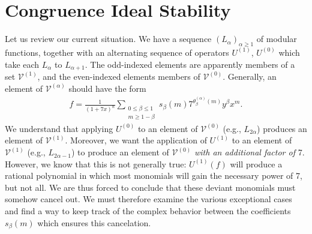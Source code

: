 \documentclass[reqno]{amsart}
\theoremstyle{definition}
\theoremstyle{remark}
\numberwithin{equation}{section}
\begin{document}
\section{Congruence Ideal Stability}\label{sectionstable} 

Let us review our current situation.  We have a sequence $\left( L_{\alpha} \right)_{\alpha\ge 1}$ of modular functions, together with an alternating sequence of operators $U^{(1)}$, $U^{(0)}$ which take each $L_{\alpha}$ to $L_{\alpha+1}$.  The odd-indexed elements are apparently members of a set $\mathcal{V}^{(1)}$, and the even-indexed elements members of $\mathcal{V}^{(0)}$.  Generally, an element of $\mathcal{V}^{(\alpha)}$ should have the form
\begin{align*}
f =\frac{1}{(1+7x)^n}\sum_{\substack{0\le\beta\le 1\\ m\ge 1-\beta}}s_{\beta}(m)7^{\theta^{(\alpha)}_{\beta}(m)}y^{\beta}x^m.
\end{align*}  We understand that applying $U^{(0)}$ to an element of $\mathcal{V}^{(0)}$ (e.g., $L_{2\alpha}$) produces an element of $\mathcal{V}^{(1)}$.  Moreover, we want the application of $U^{(1)}$ to an element of $\mathcal{V}^{(1)}$ (e.g., $L_{2\alpha-1}$) to produce an element of $\mathcal{V}^{(0)}$ \textit{with an additional factor of} 7.  However, we know that this is not generally true: $U^{(1)}(f)$ will produce a rational polynomial in which most monomials will gain the necessary power of 7, but not all.  We are thus forced to conclude that these deviant monomials must somehow cancel out.  We must therefore examine the various exceptional cases and find a way to keep track of the complex behavior between the coefficients $s_{\beta}(m)$ which ensures this cancelation.
\end{document}
